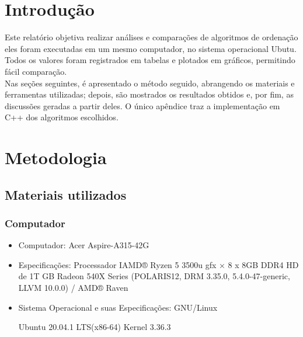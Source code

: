 \documentclass[a4paper, 12pt]{article}
\begin{document}
	\newpage
	\section{Introdução}
	
		Este relatório objetiva realizar análises e comparações de algoritmos de ordenação eles foram executadas em um mesmo computador, no sistema operacional Ubutu. Todos os valores foram registrados em tabelas e plotados em gráficos, permitindo fácil comparação.\\
		\indent
		Nas seções seguintes, é apresentado o método seguido, abrangendo os materiais e ferramentas utilizadas; depois, são mostrados os resultados obtidos e, por fim, as discussões geradas a partir deles. O único apêndice traz a implementação em C++ dos algoritmos escolhidos.
	

	
	
	\section{Metodologia}
		
		\subsection{Materiais utilizados}
		
		\subsubsection{Computador}
	

		\begin{itemize}
		
		\item Computador: Acer Aspire-A315-42G
		
		\item Especificações: 
			\subitem Processador IAMD® Ryzen 5 3500u gfx × 8 
			 x 8GB DDR4 
			\subitem HD de 1T GB
			\subitem Radeon 540X Series (POLARIS12, DRM 3.35.0, 5.4.0-47-generic, LLVM 10.0.0) / AMD® Raven 
	\item 	Sistema Operacional e suas Especificações: 
\subitem GNU/Linux

\subsubitem Ubuntu 20.04.1 LTS(x86-64)
Kernel 3.36.3 

	\end{itemize}
	

	
\end{document}
